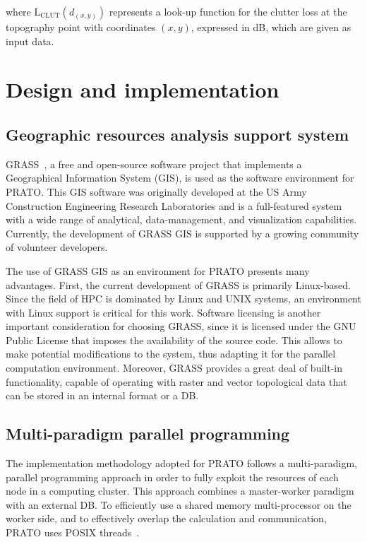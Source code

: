 \noindent where $\mathrm{L}{}_{\mathrm{CLUT}}(d_{(x,y)})$ represents
a look-up function for the clutter loss at the topography point with
coordinates $(x,y)$, expressed in dB, which are given as input data.


\section{Design and implementation \label{sec:04-Design_and_implementation}}


\subsection{Geographic resources analysis support system}

GRASS~\cite{Neteler_Open_source_GIS_a_GRASS_GIS_approach}, a free
and open-source software project that implements a Geographical Information
System (GIS),
is used as the software environment for PRATO. This GIS software was
originally developed at the US Army Construction Engineering Research
Laboratories and is a full-featured system with a wide range of analytical,
data-management, and visualization capabilities. Currently, the development
of GRASS GIS is supported by a growing community of volunteer developers.

The use of GRASS GIS as an environment for PRATO presents many advantages.
First, the current development of GRASS is primarily Linux-based.
Since the field of HPC is dominated by Linux and UNIX systems, an
environment with Linux support is critical for this work. Software
licensing is another important consideration for choosing GRASS, since
it is licensed under the GNU Public License \cite{Stallman_GNU_License:1991}
that imposes the availability of the source code. This allows to make
potential modifications to the system, thus adapting it for the parallel
computation environment. Moreover, GRASS provides a great deal of
built-in functionality, capable of operating with raster and vector
topological data that can be stored in an internal format or a DB.


\subsection{Multi-paradigm parallel programming}

The implementation methodology adopted for PRATO follows a multi-paradigm,
parallel programming approach in order to fully exploit the resources
of each node in a computing cluster. This approach combines a master-worker
paradigm with an external DB. To efficiently use a shared memory multi-processor
on the worker side, and to effectively overlap the calculation and
communication, PRATO uses POSIX threads~\cite{Butenhof_Programming.with.POSIX.threads:1997}.

